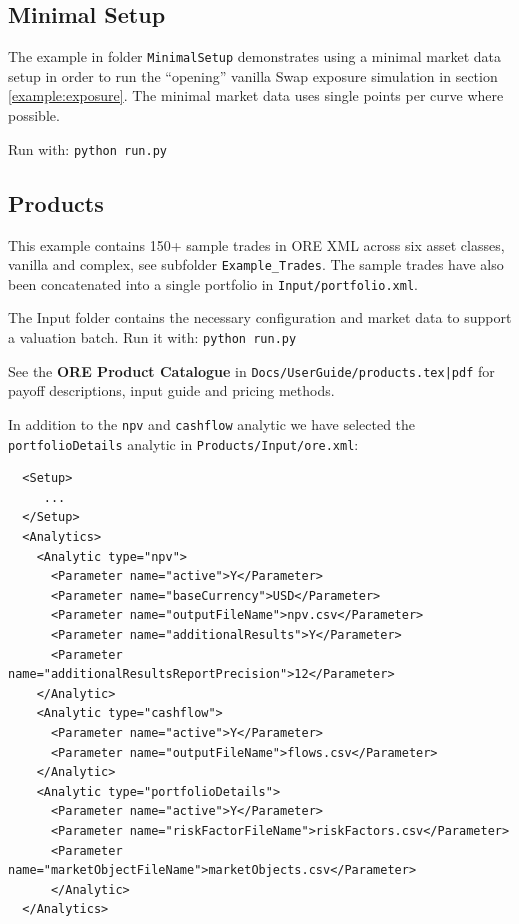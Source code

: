 \subsection{Minimal Setup}\label{example:minimal}

The example in folder {\tt MinimalSetup} demonstrates using a minimal market data setup in order to run the ``opening''
vanilla Swap exposure simulation in section \ref{example:exposure}.
The minimal market data uses single points per curve where possible.

Run with: {\tt python run.py}

\subsection{Products}

This example contains 150+ sample trades in ORE XML across six asset classes, vanilla and complex, see subfolder {\tt Example\_Trades}.
The sample trades have also been concatenated into a single portfolio in {\tt Input/portfolio.xml}.

The Input folder contains the necessary configuration and market data to support a valuation batch. Run it with: {\tt python run.py}

See the {\bf ORE Product Catalogue} in {\tt Docs/UserGuide/products.tex|pdf} for payoff descriptions, input guide and pricing methods.

\medskip
In addition to the {\tt npv} and {\tt cashflow} analytic we have selected the {\tt portfolioDetails} analytic in {\tt Products/Input/ore.xml}:

\begin{verbatim}
  <Setup>
     ...
  </Setup>
  <Analytics>
    <Analytic type="npv">
      <Parameter name="active">Y</Parameter>
      <Parameter name="baseCurrency">USD</Parameter>
      <Parameter name="outputFileName">npv.csv</Parameter>
      <Parameter name="additionalResults">Y</Parameter>
      <Parameter name="additionalResultsReportPrecision">12</Parameter>
    </Analytic>
    <Analytic type="cashflow">
      <Parameter name="active">Y</Parameter>
      <Parameter name="outputFileName">flows.csv</Parameter>
    </Analytic>
    <Analytic type="portfolioDetails">
      <Parameter name="active">Y</Parameter>
      <Parameter name="riskFactorFileName">riskFactors.csv</Parameter>
      <Parameter name="marketObjectFileName">marketObjects.csv</Parameter>
      </Analytic>
  </Analytics>
\end{verbatim}

